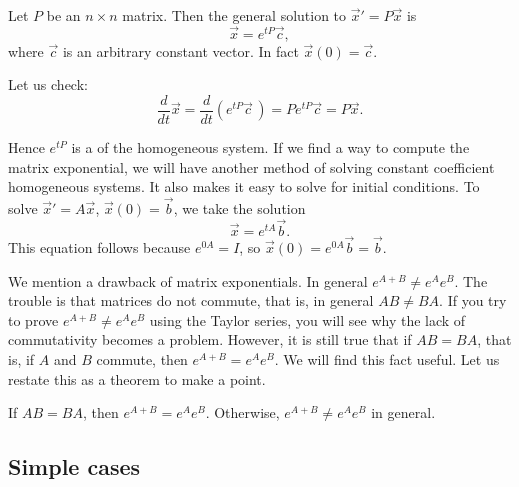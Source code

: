 \begin{theorem}
Let $P$ be an $n \times n$ matrix.  Then the general solution to
${\vec{x}}' = P \vec{x}$ is
\begin{equation*}
\vec{x} = e^{tP} \vec{c} ,
\end{equation*}
where $\vec{c}$ is an arbitrary constant vector.  In fact $\vec{x}(0) =
\vec{c}$.
\end{theorem}

Let us check:
\begin{equation*}
\frac{d}{dt}
\vec{x} =
\frac{d}{dt} \left( 
e^{tP} \vec{c}\, \right)
=
P e^{tP} \vec{c} =
P \vec{x}.
\end{equation*}

Hence $e^{tP}$ is a 
of the homogeneous system.
If we find a way to compute the matrix exponential,
we will have another method of solving constant coefficient homogeneous
systems.  It also makes it easy to solve for initial conditions.  To solve 
${\vec{x}}' = A \vec{x}$, $\vec{x}(0) = \vec{b}$, we take the solution
\begin{equation*}
\vec{x} = e^{tA} \vec{b} .
\end{equation*}
This equation follows because $e^{0A} = I$,
so $\vec{x} (0) = e^{0A} \vec{b} = \vec{b}$.

\medskip

We mention a drawback of matrix exponentials.
In general $e^{A+B} \not= e^A e^B$.  The trouble is that matrices do
not commute, that is, in general $AB \not= BA$.
If you try to prove $e^{A+B} \not= e^A e^B$ using the Taylor series,
you will see why the lack of commutativity becomes a problem.
However, it is still true that if
$AB = BA$, that is, if $A$ and $B$ commute, then $e^{A+B} = e^Ae^B$.  We will
find this fact useful.  Let us restate this as a theorem to make a point.

\begin{theorem}
If $AB = BA$, then $e^{A+B} = e^Ae^B$.  Otherwise,
$e^{A+B} \not= e^Ae^B$ in general.
\end{theorem}

\subsection{Simple cases}

